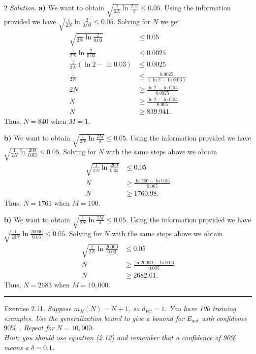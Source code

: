 \documentclass[12pt]{article}
\newcommand{\spacingfactor}{2}
\newcommand\myqed{}                 %
\newcommand{\printmyqed}[1][]       %
  {%
  \ifthenelse{\equal{#1}{Proof}}
  {\renewcommand{\myqed}{\qed}}
  {\renewcommand{\myqed}{}}
  }
\newenvironment{exercise}[1][]{%
  \bigskip                          %
  \noindent \textsf{Exercise #1.}\slshape }{}
\newenvironment{response}[1][\textit{Solution}]{%
  \printmyqed[#1]
  \begin{spacing}{\spacingfactor}
  \medskip                          %
  \noindent \textit{#1.}}{\myqed\end{spacing}\medskip\hrule}
\begin{document}
  
\begin{response}[Solution]
\textbf{a)} We want to obtain $ \sqrt{\frac{1}{2N}\ln\frac{2M}{\delta}} \leq 0.05$. 
Using the information provided we have $ \sqrt{\frac{1}{2N}\ln\frac{2}{0.03}} \leq 0.05$. 
Solving for $N$ we get 
\begin{align*}
  \sqrt{\frac{1}{2N}\ln\frac{2}{0.03}} &\leq 0.05 \\
  \frac{1}{2N}\ln\frac{2}{0.03} &\leq 0.0025 \\
  \frac{1}{2N}(\ln2 - \ln0.03) &\leq 0.0025 \\
  \frac{1}{2N} &\leq \frac{0.0025}{(\ln2 - \ln0.03)} \\
  2N &\geq \frac{\ln2 - \ln0.03}{0.0025} \\
  N &\geq \frac{\ln2 - \ln0.03}{0.005} \\
  N &\geq 839.941.
\end{align*}
Thus, $N=840$ when $M=1$. 

\textbf{b)} We want to obtain $ \sqrt{\frac{1}{2N}\ln\frac{2M}{\delta}} \leq 0.05$. 
Using the information provided we have $ \sqrt{\frac{1}{2N}\ln\frac{200}{0.03}} \leq 0.05$. 
Solving for $N$ with the same steps above we obtain 
\begin{align*}
  \sqrt{\frac{1}{2N}\ln\frac{200}{0.03}} &\leq 0.05 \\
  N &\geq \frac{\ln200 - \ln0.03}{0.005} \\
  N &\geq 1760.98.
\end{align*}
Thus, $N=1761$ when $M=100$. 

\textbf{b)} We want to obtain $ \sqrt{\frac{1}{2N}\ln\frac{2M}{\delta}} \leq 0.05$. 
Using the information provided we have $ \sqrt{\frac{1}{20N}\ln\frac{20000}{0.03}} \leq 0.05$. 
Solving for $N$ with the same steps above we obtain 
\begin{align*}
  \sqrt{\frac{1}{2N}\ln\frac{20000}{0.03}} &\leq 0.05 \\
  N &\geq \frac{\ln20000 - \ln0.03}{0.005} \\
  N &\geq 2682.01.
\end{align*}
Thus, $N=2683$ when $M=10,000$. 
\end{response}


\begin{exercise}[2.11] %
Suppose $m_H(N)=N+1$, so $d_{VC}=1$. You have 100 training examples. 
Use the generalization bound to give a bouond for $E_{out}$ with 
confidence $90\%$ . Repeat for $N=10,000$. \\
  Hint: you should use equation (2.12) and remember that a confidence
of 90\% means a $\delta=0.1$. 
\end{exercise}
   
\end{document}
